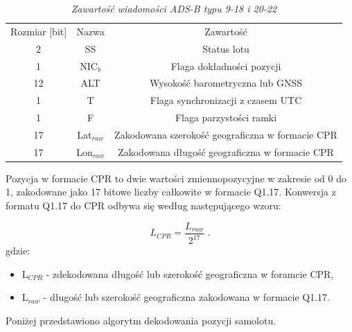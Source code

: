 \documentclass[eng,printmode]{mgr}
\begin{document}
\begin{table}[htb]
\def\arraystretch{1.3}%
\caption{\textit{ Zawartość wiadomości ADS-B typu 9-18 i 20-22}}
\label{tab:adsb}
  \centering
  \def\arraystretch{1.3}%
  \begin{tabular}{|c|c|c|}
  \hline
  
  \multicolumn{1}{|c|}{Rozmiar [bit]} & \multicolumn{1}{c|}{Nazwa} & \multicolumn{1}{c|}{Zawartość} \\\cline{1-3}
  \multicolumn{1}{|c|}{2} & \multicolumn{1}{c|}{SS} & \multicolumn{1}{c|}{Status lotu}\\\cline{1-3}
  \multicolumn{1}{|c|}{1} & \multicolumn{1}{c|}{NIC$_b$} & \multicolumn{1}{c|}{Flaga dokładności pozycji}\\\cline{1-3}
  \multicolumn{1}{|c|}{12} & \multicolumn{1}{c|}{ALT} & \multicolumn{1}{c|}{Wysokość barometryczna lub GNSS}\\\cline{1-3}
  \multicolumn{1}{|c|}{1} & \multicolumn{1}{c|}{T} & \multicolumn{1}{c|}{Flaga synchronizacji z czasem UTC}\\\cline{1-3}
  \multicolumn{1}{|c|}{1} & \multicolumn{1}{c|}{F} & \multicolumn{1}{c|}{Flaga parzystości ramki}\\\cline{1-3}
  \multicolumn{1}{|c|}{17} & \multicolumn{1}{c|}{Lat$_{raw}$} & \multicolumn{1}{c|}{Zakodowana szerokość geograficzna w formacie CPR}\\\cline{1-3}
  \multicolumn{1}{|c|}{17} & \multicolumn{1}{c|}{Lon$_{raw}$} & \multicolumn{1}{c|}{Zakodowana długość geograficzna w formacie CPR}\\\cline{1-3}   
 \end{tabular}
\end{table}
\vskip 0.5cm
Pozycja w formacie CPR to dwie wartości zmiennopozycyjne w zakresie od 0 do 1, zakodowane jako 17 bitowe liczby całkowite w formacie Q1.17. Konwersja z formatu Q1.17 do CPR odbywa się według następującego wzoru:
\newpage

\begin{equation}
L_{CPR} = \frac{L_{raw}}{2^{17}}\textrm{ .}
\end{equation}
gdzie:
\begin{itemize}
\item L$_{CPR}$ - zdekodowana długość lub szerokość geograficzna w foramcie CPR,
\item L$_{raw}$ - długość lub szerokość geograficzna zakodowana w formacie Q1.17.
\end{itemize}
\vskip 0.5cm
\noindent
Poniżej przedstawiono algorytm dekodowania pozycji samolotu.
\\
\end{document}
